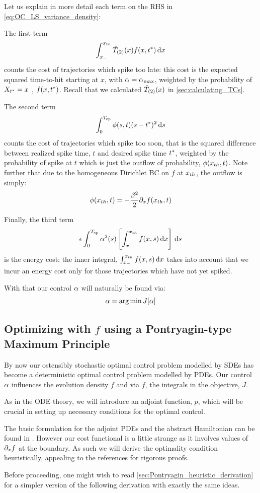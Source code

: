 \documentclass{article}
\begin{document}
Let us explain in more detail each term on the RHS in
\cref{eq:OC_LS_variance_density}:

The first term
$$
\int_{ x_{-} }^{ x_{th} } { \hat{T}_{(2)} }(x) f(x,{ t^* }) \, \mathrm{d} x
$$
counts the cost of trajectories which spike too late:
this cost is the expected squared time-to-hit starting at $x$, with  ${\alpha}
= { {\alpha}_{\textrm{max}} }$, weighted by the probability of $X_{ t^* } = x$ , $f(x,{ t^* })$. Recall
that we calculated ${ \hat{T}_{(2)} }(x)$ in \cref{sec:calculating_TCs}.

The second term
$$
\int_0^{ T_{\textrm{sp} } } \phi(s,t) (s-{ t^* })^2 \, \mathrm{d} s
$$
counts the cost of trajectories which spike too soon, that
is the squared difference between realized spike time, $t$ and desired spike
time ${ t^* }$, weighted by the probability of spike at $t$ which is just the outflow of
probability, $\phi({ x_{th} },t)$. Note further that due to the homogeneous
Dirichlet BC on $f$ at ${ x_{th} }$, the outflow is simply:
$$
\phi({ x_{th} }, t) = -\frac{{\beta}^2 }{2} {\partial}_x f({ x_{th} }, t) 
$$

Finally, the third term
$$
{\epsilon} \int_0^{ T_{\textrm{sp} } }  {\alpha}^2(s)  \left[  \int_{ x_{-} }^{ x_{th} } f(x,s) \, \mathrm{d} x \right] \, \mathrm{d} s
$$
is the energy cost: the inner integral, $\int_{ x_{-} }^{ x_{th} } f(x,s) \, \mathrm{d} x$
takes into account that we incur an energy cost only for those trajectories
which have not yet spiked.

With that our control ${\alpha}$ will naturally be found via:
$$
\a = \argmin J[\a]
$$

\subsection{Optimizing with $f$ using a Pontryagin-type Maximum Principle}
\label{sec:PDE_max_principle_for_pdf}
By now our ostensibly stochastic optimal control problem modelled by SDEs
has become a deterministic optimal control problem modelled by PDEs. Our control
${\alpha}$ influences the evolution density $f$ and via $f$, the integrals in the
objective, $J$.

As in the ODE theory, we will introduce an adjoint function, $p$, which will be
crucial in setting up necessary conditions for the optimal control.

The basic formulation for the adjoint PDEs and the abstract Hamiltonian can be
found in \cite{Fattorini1999,Palmer2011}. However our cost functional is a
little strange as it involves values of ${\partial}_x f$ at the boundary. As such we
will derive the optimality condition heuristically, appealing to the
references for rigorous proofs.

Before proceeding, one might wish to read
\cref{sec:Pontryagin_heuristic_derivation} for a simpler version of the
following derivation with exactly the same ideas.
\end{document}

